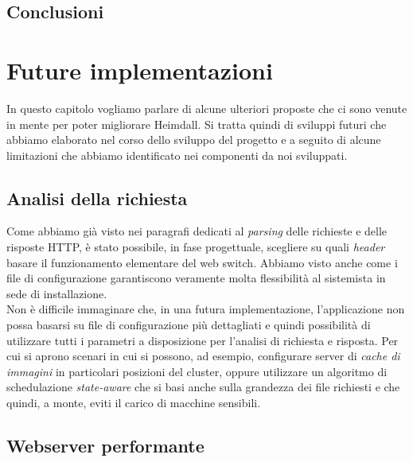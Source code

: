 \documentclass[italian]{tktltiki2}
\begin{document}
\subsection{Conclusioni}
\newpage
\section{Future implementazioni}
In questo capitolo vogliamo parlare di alcune ulteriori proposte che ci sono venute in mente per poter migliorare Heimdall. Si tratta quindi di sviluppi futuri che abbiamo elaborato nel corso dello sviluppo del progetto e a seguito di alcune limitazioni che abbiamo identificato nei componenti da noi sviluppati.
\subsection{Analisi della richiesta}
Come abbiamo già visto nei paragrafi dedicati al \emph{parsing} delle richieste e delle risposte HTTP, è stato possibile, in fase progettuale, scegliere su quali \emph{header} basare il funzionamento elementare del web switch. Abbiamo visto anche come i file di configurazione garantiscono veramente molta flessibilità al sistemista in sede di installazione.
\\
Non è difficile immaginare che, in una futura implementazione, l'applicazione non possa basarsi su file di configurazione più dettagliati e quindi possibilità di utilizzare tutti i parametri a disposizione per l'analisi di richiesta e risposta. Per cui si aprono scenari in cui si possono, ad esempio, configurare server di \emph{cache di immagini} in particolari posizioni del cluster, oppure utilizzare un algoritmo di schedulazione \emph{state-aware} che si basi anche sulla grandezza dei file richiesti e che quindi, a monte, eviti il carico di macchine sensibili.
\subsection{Webserver performante}
\end{document}
